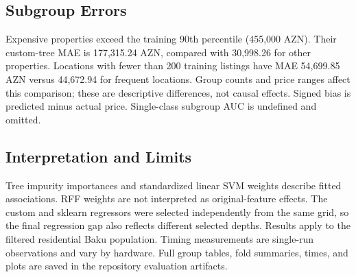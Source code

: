 \subsection{Subgroup Errors}
Expensive properties exceed the training 90th percentile (455,000 AZN). Their custom-tree MAE is 177,315.24 AZN, compared with 30,998.26 for other properties. Locations with fewer than 200 training listings have MAE 54,699.85 AZN versus 44,672.94 for frequent locations. Group counts and price ranges affect this comparison; these are descriptive differences, not causal effects. Signed bias is predicted minus actual price. Single-class subgroup AUC is undefined and omitted.
\subsection{Interpretation and Limits}
Tree impurity importances and standardized linear SVM weights describe fitted associations. RFF weights are not interpreted as original-feature effects. The custom and sklearn regressors were selected independently from the same grid, so the final regression gap also reflects different selected depths. Results apply to the filtered residential Baku population. Timing measurements are single-run observations and vary by hardware. Full group tables, fold summaries, times, and plots are saved in the repository evaluation artifacts.
